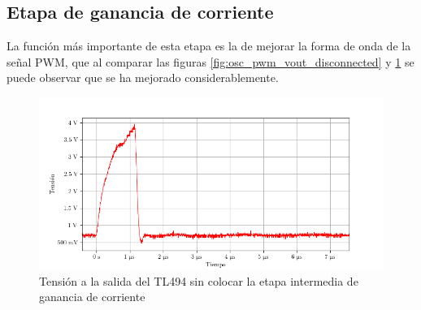 


\subsection{Etapa de ganancia de corriente}





La función más importante de esta etapa es la de mejorar la forma de onda de la señal PWM, que al comparar las figuras \ref{fig:osc_pwm_vout_disconnected} y \ref{fig:pwm_vout_sin_bjt} se puede observar que se ha mejorado considerablemente.

\begin{figure}[H]
    \centering
    \includegraphics[width=\textwidth]{images/capturas-osciloscopio/TL494/pwm_vout_sin_bjt.png}
    \caption{Tensión a la salida del TL494 sin colocar la etapa intermedia de ganancia de corriente}
    \label{fig:pwm_vout_sin_bjt}
\end{figure}

